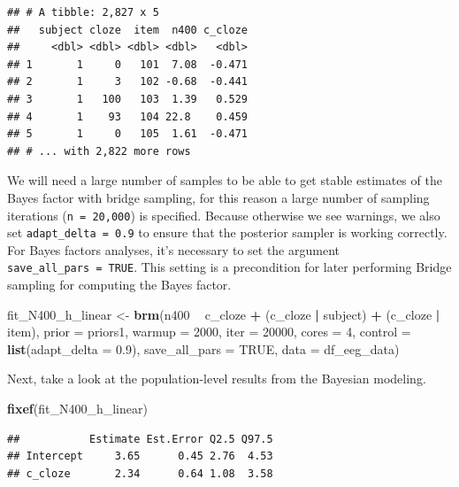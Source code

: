 \documentclass[12pt,]{krantz}
\newenvironment{Shaded}{\begin{snugshade}}{\end{snugshade}}
\newcommand{\DataTypeTok}[1]{\textcolor[rgb]{0.13,0.29,0.53}{#1}}
\newcommand{\DecValTok}[1]{\textcolor[rgb]{0.00,0.00,0.81}{#1}}
\newcommand{\FloatTok}[1]{\textcolor[rgb]{0.00,0.00,0.81}{#1}}
\newcommand{\KeywordTok}[1]{\textcolor[rgb]{0.13,0.29,0.53}{\textbf{#1}}}
\newcommand{\NormalTok}[1]{#1}
\newcommand{\OperatorTok}[1]{\textcolor[rgb]{0.81,0.36,0.00}{\textbf{#1}}}
\newcommand{\OtherTok}[1]{\textcolor[rgb]{0.56,0.35,0.01}{#1}}
\newcommand{\StringTok}[1]{\textcolor[rgb]{0.31,0.60,0.02}{#1}}
\theoremstyle{definition}
\theoremstyle{definition}
\theoremstyle{definition}
\theoremstyle{remark}
\begin{document}
\begin{verbatim}
## # A tibble: 2,827 x 5
##   subject cloze  item  n400 c_cloze
##     <dbl> <dbl> <dbl> <dbl>   <dbl>
## 1       1     0   101  7.08  -0.471
## 2       1     3   102 -0.68  -0.441
## 3       1   100   103  1.39   0.529
## 4       1    93   104 22.8    0.459
## 5       1     0   105  1.61  -0.471
## # ... with 2,822 more rows
\end{verbatim}

We will need a large number of samples to be able to get stable estimates of the Bayes factor with bridge sampling, for this reason a large number of sampling iterations (\texttt{n\ =\ 20,000}) is specified. Because otherwise we see warnings, we also set \texttt{adapt\_delta\ =\ 0.9} to ensure that the posterior sampler is working correctly. For Bayes factors analyses, it's necessary to set the argument \texttt{save\_all\_pars\ =\ TRUE}. This setting is a precondition for later performing Bridge sampling for computing the Bayes factor.

\begin{Shaded}
\begin{Highlighting}[]
\NormalTok{fit_N400_h_linear <-}\StringTok{ }\KeywordTok{brm}\NormalTok{(n400 }\OperatorTok{~}\StringTok{ }\NormalTok{c_cloze }\OperatorTok{+}\StringTok{ }
\StringTok{        }\NormalTok{(c_cloze }\OperatorTok{|}\StringTok{ }\NormalTok{subject) }\OperatorTok{+}\StringTok{ }\NormalTok{(c_cloze }\OperatorTok{|}\StringTok{ }\NormalTok{item), }
        \DataTypeTok{prior   =}\NormalTok{ priors1,}
        \DataTypeTok{warmup  =} \DecValTok{2000}\NormalTok{,}
        \DataTypeTok{iter    =} \DecValTok{20000}\NormalTok{,}
        \DataTypeTok{cores   =} \DecValTok{4}\NormalTok{,}
        \DataTypeTok{control =} \KeywordTok{list}\NormalTok{(}\DataTypeTok{adapt_delta =} \FloatTok{0.9}\NormalTok{),}
        \DataTypeTok{save_all_pars =} \OtherTok{TRUE}\NormalTok{,}
        \DataTypeTok{data    =}\NormalTok{ df_eeg_data)}
\end{Highlighting}
\end{Shaded}

Next, take a look at the population-level results from the Bayesian modeling.

\begin{Shaded}
\begin{Highlighting}[]
\KeywordTok{fixef}\NormalTok{(fit_N400_h_linear)}
\end{Highlighting}
\end{Shaded}

\begin{verbatim}
##           Estimate Est.Error Q2.5 Q97.5
## Intercept     3.65      0.45 2.76  4.53
## c_cloze       2.34      0.64 1.08  3.58
\end{verbatim}
\end{document}
